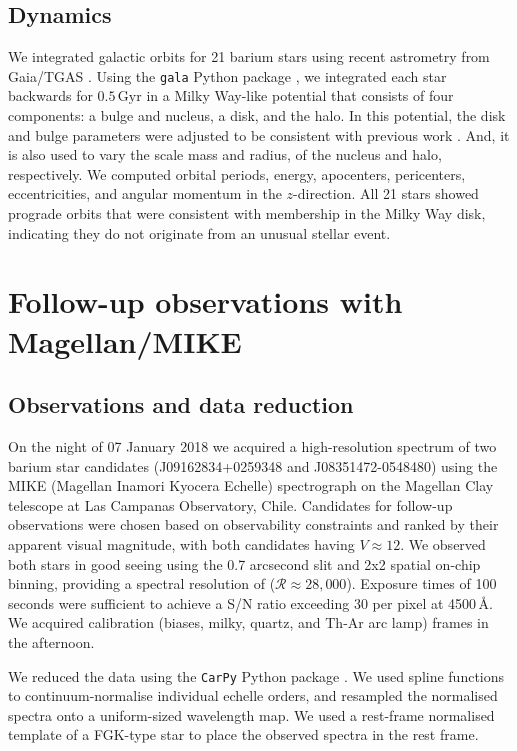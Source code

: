 \documentclass[a4paper,fleqn,usenatbib]{mnras}
\begin{document}
\subsection{Dynamics}
We integrated galactic orbits for 21 barium stars using recent astrometry from Gaia/TGAS \citep{gaia2016a,gaia2016b}. Using the \texttt{gala} Python package \citep{price2017}, we integrated each star backwards for $0.5\,\textrm{Gyr}$ in a Milky Way-like potential that consists of four components: a \citet{hernquist1990} bulge and nucleus, a \citet{miyamoto1975} disk, and the \citet{nfw1997} halo. In this potential, the disk and bulge parameters were adjusted to be consistent with previous work \citep{bovy2015}. And, it is also used to vary the scale mass and radius, of the nucleus and halo, respectively. We computed orbital periods, energy, apocenters, pericenters, eccentricities, and angular momentum in the $z$-direction. All 21 stars showed prograde orbits that were consistent with membership in the Milky Way disk, indicating they do not originate from an unusual stellar event.

\section{Follow-up observations with Magellan/MIKE}

\subsection{Observations and data reduction}
On the night of 07 January 2018 we acquired a high-resolution spectrum of two barium star candidates (J09162834+0259348 and J08351472-0548480) using the MIKE (Magellan Inamori Kyocera Echelle) \citep{bernstein2003} spectrograph on the Magellan Clay telescope \citep{schectman2003} at Las Campanas Observatory, Chile. Candidates for follow-up observations were chosen based on observability constraints and ranked by their apparent visual magnitude, with both candidates having $V \approx 12$. We observed both stars in good seeing using the 0.7 arcsecond slit and 2x2 spatial on-chip binning, providing a spectral resolution of ($\mathcal{R} \approx 28,000$). Exposure times of 100 seconds were sufficient to achieve a S/N ratio exceeding 30 per pixel at 4500\,\AA. We acquired calibration (biases, milky, quartz, and Th-Ar arc lamp) frames in the afternoon.

We reduced the data using the \texttt{CarPy} Python package \citep{kelson2000,kelson2003}. We used spline functions to continuum-normalise individual echelle orders, and resampled the normalised spectra onto a uniform-sized wavelength map. We used a rest-frame normalised template of a FGK-type star to place the observed spectra in the rest frame.
\end{document}
